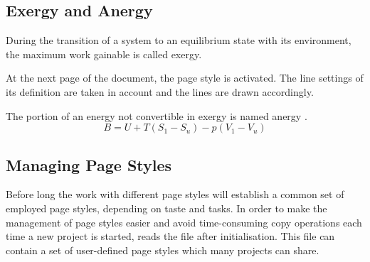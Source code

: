 \begin{Example}
\begin{lstcode}
  \section{Exergy and Anergy}
  During the transition of a system to an equilibrium state
  with its environment, the maximum work gainable is called
  exergy.
\end{lstcode}
  \begin{XmpTopPage}
    \thinlines{}
  \end{XmpTopPage}

  At the next page of the document, the page style  is
  activated.  The line settings of its definition are taken in account
  and the lines are drawn accordingly.
\begin{lstcode}
  \pagestyle{mitLinien}
  \renewcommand{\headfont}{\itshape\bfseries}
  The portion of an energy not convertible in exergy
  is named anergy .
  \[ B = U + T (S_1 - S_u) - p (V_1 - V_u)\] 
  
\end{lstcode}
  \begin{XmpTopPage}
    \thicklines{}
  \end{XmpTopPage}
\end{Example}
\EndIndexGroup


\subsection{Managing Page Styles}\label{sec:scrpage-en.UI.cfgFile}
Before long the work with different page styles will establish a
common set of employed page styles, depending on taste and tasks.  In
order to make the management of page styles easier and avoid
time-consuming copy operations each time a new project is started,
 reads the file  after
initialisation.  This file can contain a set of user-defined page
styles which many projects can share.
\EndIndexGroup


